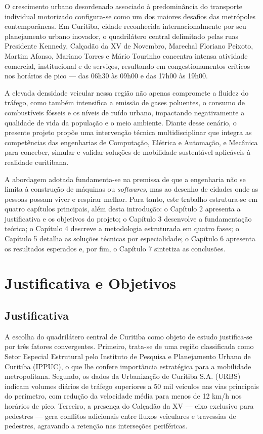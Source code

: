 \documentclass[12pt,a4paper,oneside]{abntex2}
\begin{document}
O crescimento urbano desordenado associado à predominância do transporte individual motorizado configura-se como um dos maiores desafios das metrópoles contemporâneas. Em Curitiba, cidade reconhecida internacionalmente por seu planejamento urbano inovador, o quadrilátero central delimitado pelas ruas Presidente Kennedy, Calçadão da XV de Novembro, Marechal Floriano Peixoto, Martim Afonso, Mariano Torres e Mário Tourinho concentra intensa atividade comercial, institucional e de serviços, resultando em congestionamentos críticos nos horários de pico --- das 06h30 às 09h00 e das 17h00 às 19h00.

A elevada densidade veicular nessa região não apenas compromete a fluidez do tráfego, como também intensifica a emissão de gases poluentes, o consumo de combustíveis fósseis e os níveis de ruído urbano, impactando negativamente a qualidade de vida da população e o meio ambiente. Diante desse cenário, o presente projeto propõe uma intervenção técnica multidisciplinar que integra as competências das engenharias de Computação, Elétrica e Automação, e Mecânica para conceber, simular e validar soluções de mobilidade sustentável aplicáveis à realidade curitibana.

A abordagem adotada fundamenta-se na premissa de que a engenharia não se limita à construção de máquinas ou \textit{softwares}, mas ao desenho de cidades onde as pessoas possam viver e respirar melhor. Para tanto, este trabalho estrutura-se em quatro capítulos principais, além desta introdução: o Capítulo 2 apresenta a justificativa e os objetivos do projeto; o Capítulo 3 desenvolve a fundamentação teórica; o Capítulo 4 descreve a metodologia estruturada em quatro fases; o Capítulo 5 detalha as soluções técnicas por especialidade; o Capítulo 6 apresenta os resultados esperados e, por fim, o Capítulo 7 sintetiza as conclusões.

\chapter{Justificativa e Objetivos}

\section{Justificativa}

A escolha do quadrilátero central de Curitiba como objeto de estudo justifica-se por três fatores convergentes. Primeiro, trata-se de uma região classificada como Setor Especial Estrutural pelo Instituto de Pesquisa e Planejamento Urbano de Curitiba (IPPUC), o que lhe confere importância estratégica para a mobilidade metropolitana. Segundo, os dados da Urbanização de Curitiba S.A. (URBS) indicam volumes diários de tráfego superiores a 50 mil veículos nas vias principais do perímetro, com redução da velocidade média para menos de 12 km/h nos horários de pico. Terceiro, a presença do Calçadão da XV --- eixo exclusivo para pedestres --- gera conflitos adicionais entre fluxos veiculares e travessias de pedestres, agravando a retenção nas interseções periféricas.
\end{document}
